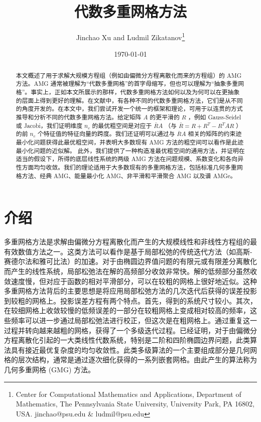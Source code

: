 \documentclass[12pt]{acta_2011xz}
\begin{document}
  

   \title{代数多重网格方法  }     

   \author{Jinchao Xu and Ludmil Zikatanov\thanks{Center for
  Computational Mathematics and Applications, Department of
  Mathematics, The Pennsylvania State University, University Park,
  PA 16802, USA.  jinchao@psu.edu  \&  ludmil@psu.edu}
}    
   \date{\today}     

   \maketitle     

   \begin{abstract}本文概述了用于求解大规模方程组（例如由偏微分方程离散化而来的方程组）的 AMG 方法。AMG 通常被理解为“代数多重网格”的首字母缩写，但也可以理解为“抽象多重网格”。事实上，正如本文所展示的那样，代数多重网格方法如何以及为何可以在更抽象的层面上得到更好的理解。在文献中，有各种不同的代数多重网格方法，它们是从不同的角度开发的。在本文中，我们尝试开发一个统一的框架和理论，可用于以连贯的方式推导和分析不同的代数多重网格方法。给定矩阵    $A$    的更平滑的    $R$   ，例如 Gauss-Seidel 或 Jacobi，我们证明维度    $n_c$    的最优粗空间是对应于    $\bar RA$   （与    $\bar R=R+R^T-R^TAR$   ）的前    $n_c$    个特征值的特征向量的跨度。我们还证明可以通过与    $\bar RA$    相关的矩阵的约束迹最小化问题获得此最优粗空间，并表明大多数现有 AMG 方法的粗空间可以看作是此迹最小化问题的近似解。
此外，我们提供了一种构造准最优粗空间的通用方法，并证明在适当的假设下，所得的底层线性系统的两级 AMG 方法在问题规模、系数变化和各向异性方面均匀收敛。我们的理论适用于大多数现有的多重网格方法，包括标准几何多重网格方法、经典 AMG、能量最小化 AMG、非平滑和平滑聚合 AMG 以及谱 AMGe。  \end{abstract}    
   \newpage    
   \tableofcontents    
   \newpage     

   \section{介绍  }    多重网格方法是求解由偏微分方程离散化而产生的大规模线性和非线性方程组的最有效数值方法之一。这类方法可以看作是基于局部松弛的传统迭代方法（如高斯-赛德尔法和雅可比法）的加速。对于由椭圆边界值问题的有限元或有限差分离散化而产生的线性系统，局部松弛法在解的高频部分收敛非常快。解的低频部分虽然收敛速度慢，但对应于函数的相对平滑部分，可以在较粗的网格上很好地近似。这种多重网格方法背后的主要思想是将应用局部松弛方法的几次迭代后获得的误差投影到较粗的网格上。投影误差方程有两个特点。首先，得到的系统尺寸较小。其次，在较细网格上收敛较慢的低频误差的一部分在较粗网格上变成相对较高的频率，这些频率可以进一步通过局部松弛法进行校正，但这次是在粗网格上。通过重复这一过程并转向越来越粗的网格，获得了一个多级迭代过程。已经证明，对于由偏微分方程离散化引起的一大类线性代数系统，特别是二阶和四阶椭圆边界问题，此类算法具有接近最优复杂度的均匀收敛性。此类多级算法的一个主要组成部分是几何网格的层次结构，通常是通过逐次细化获得的一系列嵌套网格。由此产生的算法称为几何多重网格 (GMG) 方法。  
\end{document}
